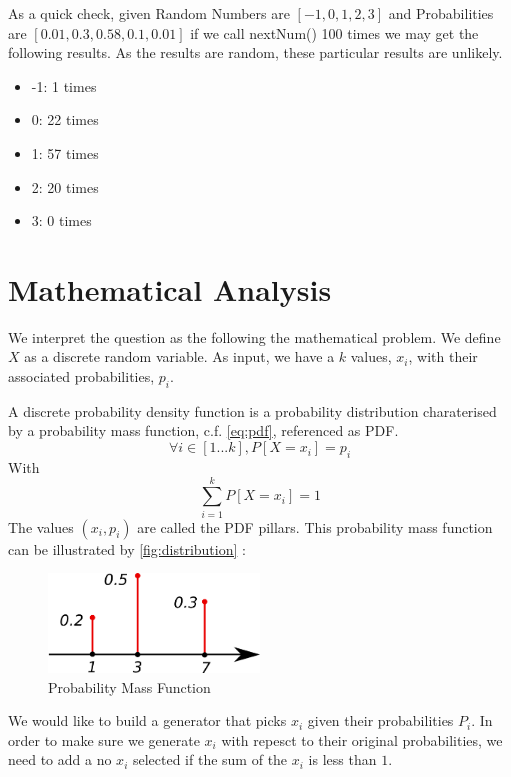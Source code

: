 \documentclass[12pt,a4paper,titlepage]{article}
\begin{document}
As a quick check, given Random Numbers are $[-1, 0, 1, 2, 3]$ and 
Probabilities are $[0.01, 0.3, 0.58, 0.1, 0.01]$ if we call nextNum() 100 times 
we may get the following results. As the results are random, these particular results are unlikely.
\begin{itemize}
	\item -1: 1 times 
	\item 0: 22 times
	\item 1: 57 times 
	\item 2: 20 times
	\item 3: 0 times 
\end{itemize}

\section{Mathematical Analysis}
\label{sec:problem}
We interpret the question as the following the mathematical problem. 
We define $X$ as a discrete random variable. 
As input, we have a $k$ values, $x_i$, with their associated probabilities, $p_i$.

A discrete probability density function is a probability distribution charaterised 
by a probability mass function, c.f. \autoref{eq:pdf}, referenced as PDF.
\begin{equation}
	\forall i \in \left[1 ...  k\right], P\left[ X = x_i \right] = p_i  
	\label{eq:pdf}
\end{equation}
With
\[ 
	\sum_{i = 1}^k  P\left[ X = x_i \right]  = 1
\]
The values $\left(x_i, p_i\right)$ are called the PDF pillars.
This probability mass function can be illustrated by \autoref{fig:distribution} :
\begin{figure}[h!]
\begin{center}
\includegraphics[width=0.5\textwidth]{img/distribution.png}
\caption{Probability Mass Function}
\label{fig:distribution}
\end{center}
\end{figure}

We would like to build a generator that picks $x_i$ given their probabilities
$P_i$. 
In order to make sure we generate $x_i$ with repesct to their original probabilities, 
we need to add a no $x_i$ selected if the sum of the $x_i$ is less than $1$.
\end{document}
